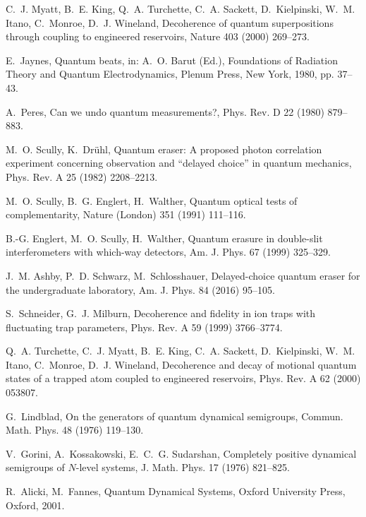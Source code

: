 \documentclass[3p,sort&compress]{elsarticle}
\begin{document}
\begin{thebibliography}{100}
C.~J. Myatt, B.~E. King, Q.~A. Turchette, C.~A. Sackett, D.~Kielpinski, W.~M.
  Itano, C.~Monroe, D.~J. Wineland, Decoherence of quantum superpositions
  through coupling to engineered reservoirs, Nature 403 (2000) 269--273.

E.~Jaynes, Quantum beats, in: A.~O. Barut (Ed.), Foundations of Radiation
  Theory and Quantum Electrodynamics, Plenum Press, New York, 1980, pp. 37--43.

A.~Peres, Can we undo quantum measurements?, Phys. Rev. D 22 (1980) 879--883.

M.~O. Scully, K.~Dr{\"u}hl, Quantum eraser: {A} proposed photon correlation
  experiment concerning observation and {``}delayed choice{''} in quantum
  mechanics, Phys. Rev. A 25 (1982) 2208--2213.

M.~O. Scully, B.~G. Englert, H.~Walther, Quantum optical tests of
  complementarity, Nature (London) 351 (1991) 111--116.

B.-G. Englert, M.~O. Scully, H.~Walther, Quantum erasure in double-slit
  interferometers with which-way detectors, Am. J. Phys. 67 (1999) 325--329.

J.~M. Ashby, P.~D. Schwarz, M.~Schlosshauer, Delayed-choice quantum eraser for
  the undergraduate laboratory, Am. J. Phys. 84 (2016) 95--105.

S.~Schneider, G.~J. Milburn, Decoherence and fidelity in ion traps with
  fluctuating trap parameters, Phys. Rev. A 59 (1999) 3766--3774.

Q.~A. Turchette, C.~J. Myatt, B.~E. King, C.~A. Sackett, D.~Kielpinski, W.~M.
  Itano, C.~Monroe, D.~J. Wineland, Decoherence and decay of motional quantum
  states of a trapped atom coupled to engineered reservoirs, Phys. Rev. A 62
  (2000) 053807.

G.~Lindblad, On the generators of quantum dynamical semigroups, Commun. Math.
  Phys. 48 (1976) 119--130.

V.~Gorini, A.~Kossakowski, E.~C.~G. Sudarshan, Completely positive dynamical
  semigroups of {$N$}-level systems, J. Math. Phys. 17 (1976) 821--825.

R.~Alicki, M.~Fannes, Quantum Dynamical Systems, Oxford University Press,
  Oxford, 2001.


\end{thebibliography}
\end{document}

